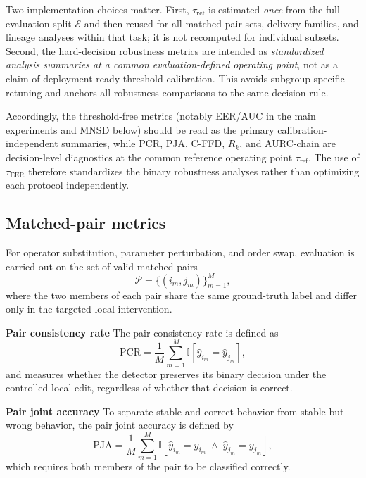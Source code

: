 Two implementation choices matter. First, $\tau_{\mathrm{ref}}$ is estimated \emph{once} from the full evaluation split $\mathcal{E}$ and then reused for all matched-pair sets, delivery families, and lineage analyses within that task; it is not recomputed for individual subsets. Second, the hard-decision robustness metrics are intended as \emph{standardized analysis summaries at a common evaluation-defined operating point}, not as a claim of deployment-ready threshold calibration. This avoids subgroup-specific retuning and anchors all robustness comparisons to the same decision rule.

Accordingly, the threshold-free metrics (notably EER/AUC in the main experiments and MNSD below) should be read as the primary calibration-independent summaries, while PCR, PJA, C-FFD, $R_k$, and AURC-chain are decision-level diagnostics at the common reference operating point $\tau_{\mathrm{ref}}$. The use of $\tau_{\mathrm{EER}}$ therefore standardizes the binary robustness analyses rather than optimizing each protocol independently.

\subsection{Matched-pair metrics}

For operator substitution, parameter perturbation, and order swap, evaluation is carried out on the set of valid matched pairs
\begin{equation}
\mathcal{P} = \{(i_m,j_m)\}_{m=1}^{M},
\label{eq:pair_set}
\end{equation}
where the two members of each pair share the same ground-truth label and differ only in the targeted local intervention.

\noindent\textbf{Pair consistency rate} The pair consistency rate is defined as
\begin{equation}
\mathrm{PCR} =
\frac{1}{M}
\sum_{m=1}^{M}
\mathbb{I}[\hat{y}_{i_m}=\hat{y}_{j_m}],
\label{eq:pcr}
\end{equation}
and measures whether the detector preserves its binary decision under the controlled local edit, regardless of whether that decision is correct.

\noindent\textbf{Pair joint accuracy} To separate stable-and-correct behavior from stable-but-wrong behavior, the pair joint accuracy is defined by
\begin{equation}
\mathrm{PJA} =
\frac{1}{M}
\sum_{m=1}^{M}
\mathbb{I}[\hat{y}_{i_m}=y_{i_m} \;\land\; \hat{y}_{j_m}=y_{j_m}],
\label{eq:pja}
\end{equation}
which requires both members of the pair to be classified correctly.

